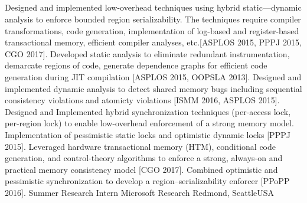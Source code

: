 \documentclass[10pt,a4paper,roman]{moderncv}
\begin{document}
\subsection{}
\cvline{--}
{Designed and implemented low-overhead techniques using hybrid static---dynamic analysis to enforce bounded region serializability. The techniques require compiler transformations, code generation, implementation of log-based and register-based transactional memory, efficient compiler analyses, etc.[ASPLOS 2015, PPPJ 2015, CGO 2017].}
\cvline{--}
{Developed static analysis to eliminate redundant  instrumentation, demarcate regions of code, generate dependence
graphs for efficient code generation during JIT compilation [ASPLOS 2015, OOPSLA 2013].}
\cvline{--}
{Designed and implemented dynamic analysis to detect shared memory bugs including sequential consistency violations and atomicty violations [ISMM 2016, ASPLOS 2015].}
\cvline{--}
{Designed and Implemented hybrid synchronization techniques (per-access lock, per-region lock) to enable low-overhead enforcement of a strong memory model. Implementation of pessimistic static locks and optimistic dynamic locks [PPPJ 2015].}
\cvline{--}
{Leveraged hardware transactional memory (HTM), conditional code generation, and control-theory algorithms to enforce a strong, always-on and practical memory consistency model [CGO 2017].}
\cvline{--}
{Combined optimistic and pessimistic synchronization to develop a region--serializability enforcer [PPoPP 2016].}
{}
{Summer Research Intern}
{Microsoft Research}
{Redmond, Seattle}{USA}
{}
\end{document}
